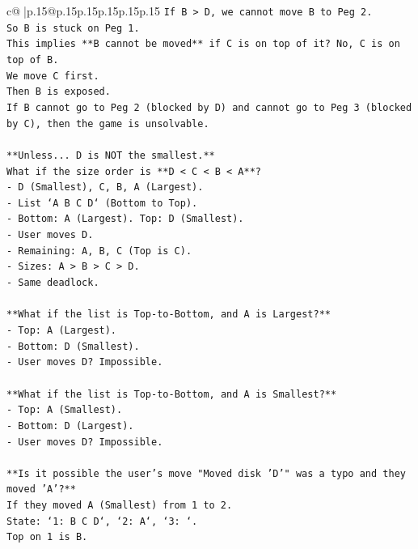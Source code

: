 \documentclass{article}
\begin{document}
{\begin{supertabular}{c@{$\;$}|p{.15\linewidth}@{}p{.15\linewidth}p{.15\linewidth}p{.15\linewidth}p{.15\linewidth}p{.15\linewidth}}
{{{\texttt{If B > D, we cannot move B to Peg 2.} \\
\texttt{So B is stuck on Peg 1.} \\
\texttt{This implies **B cannot be moved** if C is on top of it? No, C is on top of B.} \\
\texttt{We move C first.} \\
\texttt{Then B is exposed.} \\
\texttt{If B cannot go to Peg 2 (blocked by D) and cannot go to Peg 3 (blocked by C), then the game is unsolvable.} \\
\\ 
\texttt{**Unless... D is NOT the smallest.**} \\
\texttt{What if the size order is **D < C < B < A**?} \\
\texttt{{-} D (Smallest), C, B, A (Largest).} \\
\texttt{{-} List `A B C D` (Bottom to Top).} \\
\texttt{{-} Bottom: A (Largest). Top: D (Smallest).} \\
\texttt{{-} User moves D.} \\
\texttt{{-} Remaining: A, B, C (Top is C).} \\
\texttt{{-} Sizes: A > B > C > D.} \\
\texttt{{-} Same deadlock.} \\
\\ 
\texttt{**What if the list is Top{-}to{-}Bottom, and A is Largest?**} \\
\texttt{{-} Top: A (Largest).} \\
\texttt{{-} Bottom: D (Smallest).} \\
\texttt{{-} User moves D? Impossible.} \\
\\ 
\texttt{**What if the list is Top{-}to{-}Bottom, and A is Smallest?**} \\
\texttt{{-} Top: A (Smallest).} \\
\texttt{{-} Bottom: D (Largest).} \\
\texttt{{-} User moves D? Impossible.} \\
\\ 
\texttt{**Is it possible the user's move "Moved disk 'D'" was a typo and they moved 'A'?**} \\
\texttt{If they moved A (Smallest) from 1 to 2.} \\
\texttt{State: `1: B C D`, `2: A`, `3: `.} \\
\texttt{Top on 1 is B.} \\
}}}
\end{supertabular}}
\end{document}
